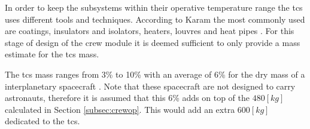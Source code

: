 In order to keep the subsystems within their operative temperature range the \gls{tcs} uses different tools and techniques. According to Karam the most commonly used are coatings, insulators and isolators, heaters, louvres and heat pipes \cite{Karam1998}. For this stage of design of the crew module it is deemed sufficient to only provide a mass estimate for the \gls{tcs} mass.

The \gls{tcs} mass ranges from 3\% to 10\% with an average of 6\% for the dry mass of a interplanetary spacecraft \cite[p.953]{Wertz2011}. Note that these spacecraft are not designed to carry astronauts, therefore it is assumed that this 6\% adds on top of the $480 \left[kg\right]$ calculated in Section \ref{subsec:crewop}. This would add an extra $600 \left[kg\right]$ dedicated to the \gls{tcs}.
